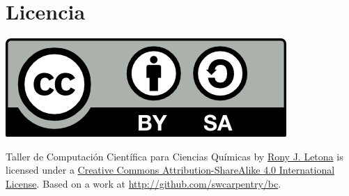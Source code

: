 \documentclass[10pt,letterpaper]{article}
\begin{document}
\section*{Licencia}

\noindent \includegraphics{img/cc_big.png}

\noindent Taller de Computaci\'on Cient\'ifica para Ciencias Qu\'imicas by \href{http://github.com/zronyj/TQCA}{Rony J. Letona} is licensed under a \href{http://creativecommons.org/licenses/by-sa/4.0/}{Creative Commons Attribution-ShareAlike 4.0 International License}.
Based on a work at \url{http://github.com/swcarpentry/bc}.
\end{document}
